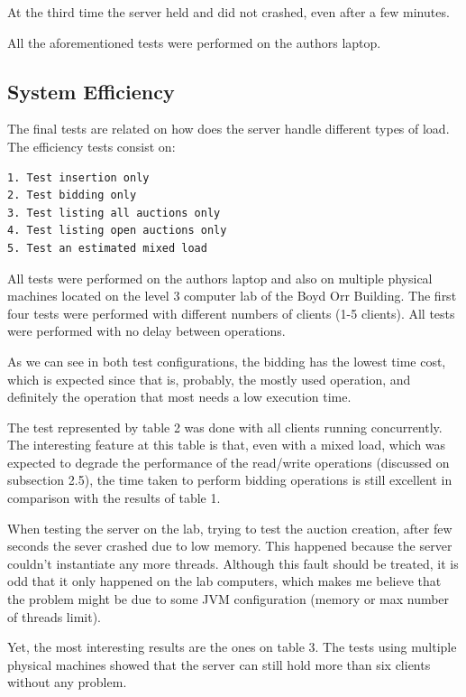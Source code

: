 \documentclass[twocolumn,10pt]{article}
\begin{document}
At the third time the server held and did not crashed, even after a few minutes.

All the aforementioned tests were performed on the authors laptop.

\subsection{System Efficiency}
The final tests are related on how does the server handle different types of load. The efficiency tests consist on:

\begin{lstlisting}
1. Test insertion only
2. Test bidding only
3. Test listing all auctions only
4. Test listing open auctions only
5. Test an estimated mixed load
\end{lstlisting}

All tests were performed on the authors laptop and also on multiple physical machines located on the level 3 computer lab of the Boyd Orr Building. The first four tests were performed with different numbers of clients (1-5 clients). All tests were performed with no delay between operations.

As we can see in both test configurations, the bidding has the lowest time cost, which is expected since that is, probably, the mostly used operation, and definitely the operation that most needs a low execution time.

The test represented by table 2 was done with all clients running concurrently. The interesting feature at this table is that, even with a mixed load, which was expected to degrade the performance of the read/write operations (discussed on subsection 2.5), the time taken to perform bidding operations is still excellent in comparison with the results of table 1.

When testing the server on the lab, trying to test the auction creation, after few seconds the sever crashed due to low memory. This happened because the server couldn't instantiate any more threads. Although this fault should be treated, it is odd that it only happened on the lab computers, which makes me believe that the problem might be due to some JVM configuration (memory or max number of threads limit).

Yet, the most interesting results are the ones on table 3. The tests using multiple physical machines showed that the server can still hold more than six clients without any problem.
\end{document}
